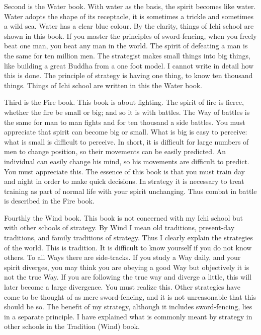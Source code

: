 \documentclass[12pt]{report}
\begin{document}
Second is the Water book. With water as the basis, the spirit becomes like water. Water adopts the shape of its receptacle, it is sometimes a trickle and sometimes a wild sea. Water has a clear blue colour. By the clarity, things of Ichi school are shown in this book. If you master the principles of sword-fencing, when you freely beat one man, you beat any man in the world. The spirit of defeating a man is the same for ten million men. The strategist makes small things into big things, like building a great Buddha from a one foot model. I cannot write in detail how this is done. The principle of strategy is having one thing, to know ten thousand things. Things of Ichi school are written in this the Water book.

Third is the Fire book. This book is about fighting. The spirit of fire is fierce, whether the fire be small or big; and so it is with battles. The Way of battles is the same for man to man fights and for ten thousand a side battles. You must appreciate that spirit can become big or small. What is big is easy to perceive: what is small is difficult to perceive. In short, it is difficult for large numbers of men to change position, so their movements can be easily predicted. An individual can easily change his mind, so his movements are difficult to predict. You must appreciate this. The essence of this book is that you must train day and night in order to make quick decisions. In strategy it is necessary to treat training as part of normal life with your spirit unchanging. Thus combat in battle is described in the Fire book.

Fourthly the Wind book. This book is not concerned with my Ichi school but with other schools of strategy. By Wind I mean old traditions, present-day traditions, and family traditions of strategy. Thus I clearly explain the strategies of the world. This is tradition. It is difficult to know yourself if you do not know others. To all Ways there are side-tracks. If you study a Way daily, and your spirit diverges, you may think you are obeying a good Way but objectively it is not the true Way. If you are following the true way and diverge a little, this will later become a large divergence. You must realize this. Other strategies have come to be thought of as mere sword-fencing, and it is not unreasonable that this should be so. The benefit of my strategy, although it includes sword-fencing, lies in a separate principle. I have explained what is commonly meant by strategy in other schools in the Tradition (Wind) book.
\end{document}
